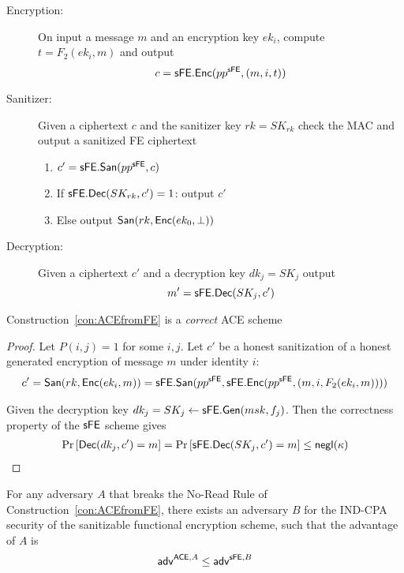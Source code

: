 \documentclass{llncs}
\begin{document}
\begin{description}
\item[Encryption:]
On input a message $m$ and an encryption key $ek_i$, compute $t = F_2(ek_i,m)$ and output $$c = \mathsf{sFE}.\mathsf{Enc}(pp^{\mathsf{sFE}},(m,i,t))$$


\item[Sanitizer:]
Given a ciphertext $c$ and the sanitizer key $rk = SK_{rk}$ check the MAC and output a sanitized FE ciphertext
\begin{enumerate}
\item $c' = \mathsf{sFE}.\mathsf{San}(pp^{\mathsf{sFE}},c)$
\item If $\mathsf{sFE}.\mathsf{Dec}(SK_{rk},c') = 1$: output $c'$
\item Else output $\mathsf{San}(rk,\mathsf{Enc}(ek_0,\bot))$ 
\end{enumerate}


\item[Decryption:] 
Given a ciphertext $c'$ and a decryption key $dk_j = SK_j$ output $$m' = \mathsf{sFE}.\mathsf{Dec}(SK_j,c')$$
\end{description}


\begin{lem} \label{lem:FEcorrect}
Construction~\ref{con:ACEfromFE} is a \emph{correct} ACE scheme \end{lem}

\begin{proof}
Let $P(i,j) = 1$ for some $i,j$. Let $c'$ be a honest sanitization of a honest generated encryption of message $m$ under identity $i$: 
\begin{align*}
c' = \mathsf{San}(rk,\mathsf{Enc}(ek_i,m)) 
	= \mathsf{sFE}.\mathsf{San}(pp^{\mathsf{sFE}},\mathsf{sFE}.\mathsf{Enc}(pp^{\mathsf{sFE}},(m,i,F_{2}(ek_i,m))))
\end{align*}

Given the decryption key $dk_j = SK_j \leftarrow \mathsf{sFE}.\mathsf{Gen}(msk,f_j)$. Then the correctness property of the $\mathsf{sFE}$ scheme gives
\begin{align*}
	\Pr \left[ 
		\mathsf{Dec}(dk_j, c') = m
	\right] 
		= \Pr \left[ 
			\mathsf{sFE}.\mathsf{Dec}(SK_j,c') = m
		\right] 
		\leq \mathsf{negl}(\kappa)
\end{align*}
\end{proof}

\begin{thm} \label{thm:ACE_sFE_no-read}
For any adversary $A$ that breaks the No-Read Rule of Construction~\ref{con:ACEfromFE}, there exists an adversary $B$ for the IND-CPA security of the sanitizable functional encryption scheme, such that the advantage of $A$ is
	\begin{align*}
	\mathsf{adv}^{\mathsf{ACE},A} \leq \mathsf{adv}^{\mathsf{sFE},B}
	\end{align*}
\end{thm}
\end{document}

